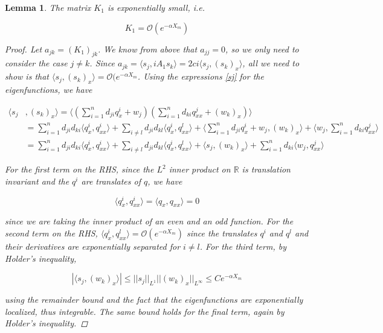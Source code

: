 \documentclass[12pt]{article}
\def\R{{\mathbb R}}
\newtheorem{lemma}{Lemma}
\begin{document}
\begin{lemma}\label{K1small}
The matrix $K_1$ is exponentially small, i.e. 

\begin{equation}
K_1 = \mathcal{O}(e^{-\alpha X_m} )
\end{equation}

\begin{proof}

Let $a_{jk} = (K_1)_{jk}$. We know from above that $a_{jj} = 0$, so we only need to consider the case $j \neq k$. Since $a_{jk} = \langle s_j, i A_1 s_k\rangle = 2 c i \langle s_j, (s_k)_x \rangle$, all we need to show is that $\langle s_j, (s_k)_x \rangle = \mathcal{O}(e^{-\alpha X_m}$. Using the expressions \eqref{sj} for the eigenfunctions, we have

\begin{align*}
\langle s_j &, (s_k)_x \rangle = 
\langle \left( \sum_{i = 1}^{n} d_{ji} q^i_x + w_j \right) \left( \sum_{i = 1}^{n} d_{ki} q^j_{xx} + (w_k)_x \right) \rangle \\
&= \sum_{i = 1}^{n} d_{ji} d_{ki} \langle q^i_x, q^i_{xx} \rangle 
+ \sum_{i \neq l} d_{ji} d_{kl} \langle q^i_x, q^l_{xx} \rangle 
+ \langle \sum_{i = 1}^{n} d_{ji} q^i_x + w_j, (w_k)_x \rangle 
+ \langle w_j, \sum_{i = 1}^{n} d_{ki} q^j_{xx} \rangle \\
&= \sum_{i = 1}^{n} d_{ji} d_{ki} \langle q^i_x, q^i_{xx} \rangle 
+ \sum_{i \neq l} d_{ji} d_{kl} \langle q^i_x, q^l_{xx} \rangle 
+ \langle s_j, (w_k)_x \rangle 
+ \sum_{i = 1}^{n} d_{ki} \langle w_j, q^j_{xx} \rangle
\end{align*}  

For the first term on the RHS, since the $L^2$ inner product on $\R$ is translation invariant and the $q^i$ are translates of $q$, we have

\[
\langle q^i_x, q^i_{xx} \rangle = \langle q_x, q_{xx} \rangle = 0
\] 

since we are taking the inner product of an even and an odd function. For the second term on the RHS, $\langle q^i_x, q^l_{xx} \rangle = \mathcal{O}(e^{-\alpha X_m})$ since the translates $q^i$ and $q^l$ and their derivatives are exponentially separated for $i \neq l$. For the third term, by Holder's inequality,

\[
|\langle s_j, (w_k)_x \rangle| \leq ||s_j||_{L^1} ||(w_k)_x||_{L^\infty} \leq C e^{-\alpha X_m}
\]

using the remainder bound and the fact that the eigenfunctions are exponentially localized, thus integrable. The same bound holds for the final term, again by Holder's inequality.

\end{proof}
\end{lemma}
\end{document}
